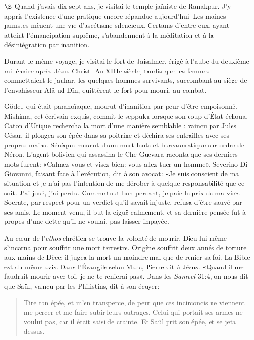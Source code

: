 \documentclass[a4paper, 12pt]{article}
\begin{document}
    
$\S$ Quand j'avais dix-sept ans, je visitai le temple jaïniste de Ranakpur. J'y
appris l'existence d'une pratique encore répandue aujourd'hui. Les moines
jaïnistes mènent une vie d'ascétisme silencieux. Certains d'entre eux, ayant
atteint l'émancipation suprême, s'abandonnent à la méditation et à la
désintégration par inanition.

Durant le même voyage, je visitai le fort de Jaisalmer, érigé à l'aube du
deuxième millénaire après Jésus-Christ. Au XIIIe siècle, tandis que les femmes
commettaient le jauhar, les quelques hommes survivants, succombant au siège de
l'envahisseur Alâ ud-Dîn, quittèrent le fort pour mourir au combat.

Gödel, qui était paranoïaque, mourut d'inanition par peur d'être empoisonné.
Mishima, cet écrivain exquis, commit le seppuku lorsque son coup d'État échoua.
Caton d'Utique rechercha la mort d'une manière semblable : vaincu par Jules
César, il plongea son épée dans sa poitrine et déchira ses entrailles avec ses
propres mains. Sénèque mourut d'une mort lente et bureaucratique sur ordre de
Néron. L'agent bolivien qui assassina le Che Guevara raconta que ses derniers
mots furent: «Calmez-vous et visez bien: vous allez tuer un homme». Severino Di
Giovanni, faisant face à l'exécution, dit à son avocat: «Je suis conscient de
ma situation et je n'ai pas l'intention de me dérober à quelque responsabilité
que ce soit. J'ai joué, j'ai perdu. Comme tout bon perdant, je paie le prix de
ma vie». Socrate, par respect pour un verdict qu'il savait injuste, refusa
d'être sauvé par ses amis. Le moment venu, il but la ciguë calmement, et sa
dernière pensée fut à propos d'une dette qu'il ne voulait pas laisser impayée.

Au cœur de l'\textit{ethos} chrétien se trouve la volonté de mourir. Dieu
lui-même s'incarna pour souffrir une mort terrestre. Origène souffrit deux annés
de torture aux mains de Dèce: il jugea la mort un moindre mal que de renier sa
foi. La Bible est du même avis: Dans l'Évangile selon Marc, Pierre dit à Jésus:
«Quand il me faudrait mourir avec toi, je ne te renierai pas». Dans les
\textit{Samuel} 31:4, on nous dit que Saül, vaincu par les Philistins, dit à son
écuyer:

\begin{quote}
Tire ton épée, et m'en transperce, de peur que ces incirconcis ne viennent me
percer et me faire subir leurs outrages. Celui qui portait ses armes ne voulut
pas, car il était saisi de crainte. Et Saül prit son épée, et se jeta dessus.
\end{quote}
\end{document}
